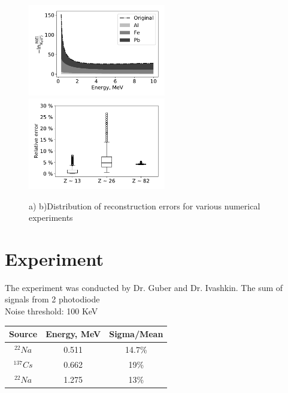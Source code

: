 \documentclass[a4paper]{panl}
\begin{document}
\begin{figure}[t]
    \begin{center}
        \includegraphics[width=60mm]{figures/reconstruction.pdf} 
        \includegraphics[width=60mm]{figures/relError.pdf}  
        \vspace{-3mm}
        \caption{a) b)Distribution of reconstruction errors for various numerical experiments}
    \end{center}
    \vspace{-5mm}
\end{figure}

\section*{Experiment}
The experiment was conducted by Dr. Guber and Dr. Ivashkin.
The sum of signals from 2 photodiode\\
Noise threshold: 100 KeV\\
\begin{center}
    \begin{tabular}[c]{|c|c|c|}
    \hline 
    Source & Energy, MeV & Sigma/Mean \\
    \hline 
    $^{22}Na$&0.511 & 14.7\%  \\ 
    \hline 
    $^{137}Cs$&0.662 & 19\%\\ 
    \hline 
    $^{22}Na$& 1.275 & 13\% \\
    \hline 
\end{tabular} 
\end{center}
\end{document}
